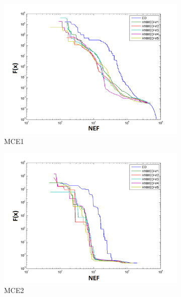 \begin{figure}
		\centering
	\captionsetup{width=.85\linewidth}
	\begin{subfigure}[b]{0.49\linewidth}
		\includegraphics[width=\linewidth]{Figures/C-Grafica_Convergencia_Problema_1}
		\caption{MCE1} \label{fig:M1} 
	\end{subfigure}
	\begin{subfigure}[b]{0.49\linewidth}
		\includegraphics[width=\textwidth]{Figures/C-Grafica_Convergencia_Problema_2}
		\caption{MCE2} \label{fig:M2} 
	\end{subfigure}
	\begin{subfigure}[b]{0.49\linewidth}

\end{subfigure}
\end{figure}
